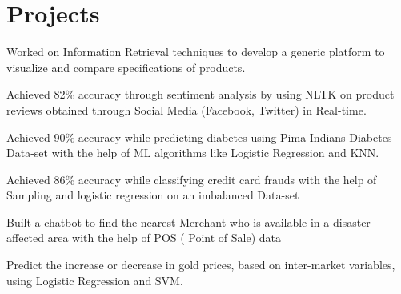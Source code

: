 \documentclass[]{deedy-resume-openfont}
\begin{document}
\begin{minipage}[t]{0.66\textwidth}
\sectionsep





\section{Projects}


\begin{tightemize}


\item \normalsize {Worked on Information Retrieval techniques to develop a generic platform to visualize and compare specifications of products.
\item Achieved 82\% accuracy through sentiment analysis by using NLTK on product reviews obtained through Social Media (Facebook, Twitter) in Real-time.} \end{tightemize}
\sectionsep

\begin{tightemize}
\item \normalsize { Achieved 90\%  accuracy while predicting diabetes using Pima Indians Diabetes Data-set with the help of ML algorithms like Logistic Regression and KNN.} \end{tightemize}
\sectionsep

\begin{tightemize}
\item \normalsize {Achieved 86\% accuracy while classifying credit card frauds with the help of Sampling and logistic regression on an imbalanced Data-set} \end{tightemize}
\sectionsep


\begin{tightemize}
\item \normalsize {Built a chatbot to find the nearest Merchant who is available in a disaster affected area with the help of POS ( Point of Sale)  data}\end{tightemize}
\sectionsep

\begin{tightemize}
\item \normalsize {Predict the increase or decrease in gold prices, based on inter-market variables, using Logistic Regression and SVM.}
\end{tightemize}
\sectionsep


\end{minipage}
\end{document}
